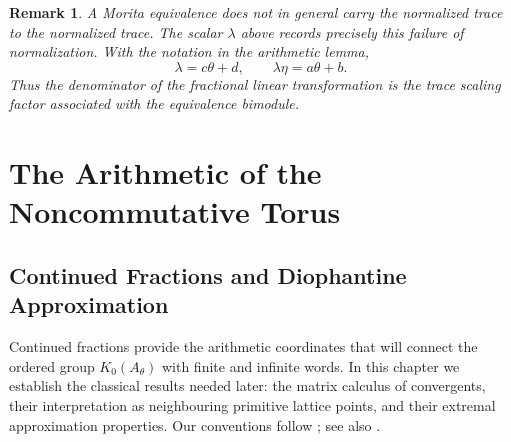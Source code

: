 \documentclass{book}
\newtheorem{remark}[definition]{Remark}
\begin{document}
\begin{remark}
  A Morita equivalence does not in general carry the normalized trace to the
  normalized trace.  The scalar \(\lambda\) above records precisely this
  failure of normalization. With the notation in the arithmetic lemma,
  \[
    \lambda=c\theta+d,
    \qquad
    \lambda\eta=a\theta+b. 
  \]
  Thus the denominator of the fractional linear transformation is the trace
  scaling factor associated with the equivalence bimodule.
\end{remark}


\part{The Arithmetic of the Noncommutative Torus}

\chapter{Continued Fractions and Diophantine Approximation}

Continued fractions provide the arithmetic coordinates that will connect the
ordered group \(K_0(A_\theta)\) with finite and infinite words. In this
chapter we establish the classical results needed later: the matrix calculus
of convergents, their interpretation as neighbouring primitive lattice
points, and their extremal approximation properties. Our conventions follow
\cite[Chapters~I--II]{Khinchin1964}; see also
\cite[Chapters~I--II]{RockettSzusz1992}.
\end{document}
